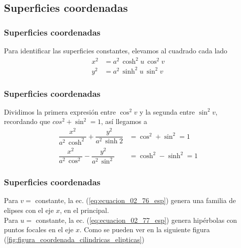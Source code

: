 \documentclass[12pt]{beamer}
\begin{document}
\subsection{Superficies coordenadas}
\begin{frame}
\frametitle{Superficies coordenadas}
Para identificar las superficies constantes, elevamos al cuadrado cada lado
\begin{align}
x^{2} &= a^{2} \, \cosh^{2} u \, \cos^{2} v \label{eq:ecuacion_02_74_esp} \\
y^{2} &= a^{2} \, \sinh^{2} u \, \sin^{2} v \label{eq:ecuacion_02_75_esp}
\end{align}
\end{frame}
\begin{frame}
\frametitle{Superficies coordenadas}
Dividimos la primera expresión entre $\cos^{2} v$ y la segunda entre $\sin^{2} v$, recordando que $cos^{2} + \sin^{2} = 1$, así llegamos a
\begin{align}
\dfrac{x^{2}}{a^{2} \, \cosh^{2}} + \dfrac{y^{2}}{a^{2} \, \sinh{2}} &= \cos^{2} + \sin^{2} = 1 \label{eq:ecuacion_02_76_esp}\\[1em]
\dfrac{x^{2}}{a^{2} \, \cos^{2}} - \dfrac{y^{2}}{a^{2} \, \sin^{2}} &= \cosh^{2} - \sinh^{2} = 1 \label{eq:ecuacion_02_77_esp}
\end{align}
\end{frame}
\begin{frame}
\frametitle{Superficies coordenadas}
Para $v=$ constante, la ec. (\ref{eq:ecuacion_02_76_esp}) genera una familia de elipses con el eje $x$, en el principal.
\\
\bigskip
Para $u=$ constante, la ec. (\ref{eq:ecuacion_02_77_esp}) genera hipérbolas con puntos focales en el eje $x$. Como se pueden ver en la siguiente figura (\ref{fig:figura_coordenada_cilindricas_elipticas})
\end{frame}
\end{document}
